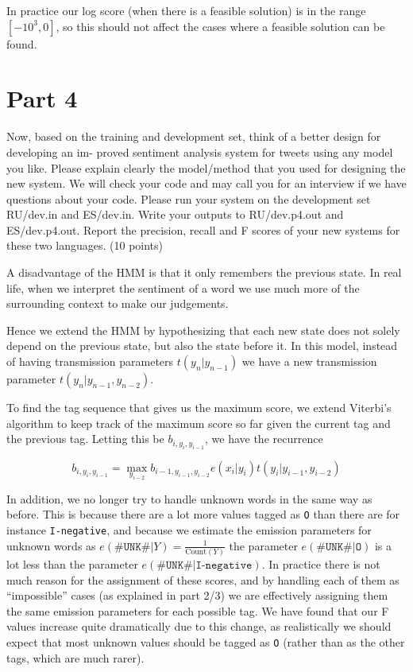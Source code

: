 \documentclass[
]{article}
\begin{document}
In practice our log score (when there is a feasible solution) is in the
range $[-10^3, 0]$, so this should not affect the cases
where a feasible solution can be found.

\hypertarget{part-4}{%
\section{Part 4}\label{part-4}}

Now, based on the training and development set, think of a better design
for developing an im- proved sentiment analysis system for tweets using
any model you like. Please explain clearly the model/method that you
used for designing the new system. We will check your code and may call
you for an interview if we have questions about your code. Please run
your system on the development set RU/dev.in and ES/dev.in. Write your
outputs to RU/dev.p4.out and ES/dev.p4.out. Report the precision, recall
and F scores of your new systems for these two languages. (10 points)

A disadvantage of the HMM is that it only remembers the previous state.
In real life, when we interpret the sentiment of a word we use much more
of the surrounding context to make our judgements.

Hence we extend the HMM by hypothesizing that each new state does not
solely depend on the previous state, but also the state before it. In
this model, instead of having transmission parameters
\(t(y_n | y_{n-1})\) we have a new transmission parameter
\(t(y_n | y_{n-1}, y_{n-2})\).

To find the tag sequence that gives us the maximum score, we extend
Viterbi's algorithm to keep track of the maximum score so far given the
current tag and the previous tag. Letting this be
\(b_{i, y_i, y_{i-1}}\), we have the recurrence

\[
b_{i, y_i, y_{i-1}} = \max_{y_{i-2}} b_{i-1, y_{i-1}, y_{i-2}} e(x_i | y_i) t(y_i | y_{i-1}, y_{i-2})
\]

In addition, we no longer try to handle unknown words in the same way as
before. This is because there are a lot more values tagged as \texttt{O}
than there are for instance \texttt{I-negative}, and because we estimate
the emission parameters for unknown words as
$e(\texttt{\#UNK\#} | Y) = \frac{1}{\text{Count}(Y)}$ the parameter
$e(\texttt{\#UNK\#} | \texttt{O})$ is a lot less than the parameter
$e(\texttt{\#UNK\#} | \texttt{I-negative})$. In practice there is not
much reason for the assignment of these scores, and by handling each of
them as ``impossible'' cases (as explained in part 2/3) we are
effectively assigning them the same emission parameters for each
possible tag. We have found that our F values increase quite
dramatically due to this change, as realistically we should expect that
most unknown values should be tagged as \texttt{O} (rather than as the
other tags, which are much rarer).
\end{document}
